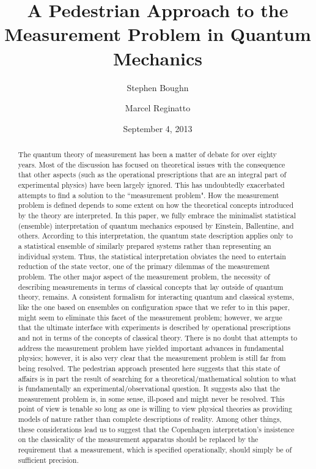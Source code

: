 \documentclass [12pt]{revtex4}
\begin{document}
\title{A Pedestrian Approach to the Measurement Problem in Quantum Mechanics}

\author{Stephen Boughn}


\author{Marcel Reginatto}
\address{Physikalisch-Technische Bundesanstalt, Braunschweig, Germany}

\date{September 4, 2013}

\begin{abstract}
\baselineskip=13pt
The quantum theory of measurement has been a matter of debate for
over eighty years. Most of the discussion has focused on theoretical
issues with the consequence that other aspects (such as the
operational prescriptions that are an integral part of experimental
physics) have been largely ignored. This has undoubtedly exacerbated
attempts to find a solution to the ``measurement problem". How the
measurement problem is defined depends to some extent on how the theoretical
concepts introduced by the theory are interpreted. In this paper, we
fully embrace the minimalist statistical (ensemble) interpretation
of quantum mechanics espoused by Einstein, Ballentine, and others.
According to this interpretation, the quantum state description
applies only to a statistical ensemble of similarly prepared systems
rather than representing an individual system. Thus, the statistical
interpretation obviates the need to entertain reduction of the state
vector, one of the primary dilemmas of the measurement problem. The
other major aspect of the measurement problem, the necessity of
describing measurements in terms of classical concepts that lay
outside of quantum theory, remains. A consistent formalism
for interacting quantum and classical systems, like the
one based on ensembles on configuration space that we
refer to in this paper, might seem to eliminate this facet of the
measurement problem; however, we argue that the ultimate interface
with experiments is described by operational prescriptions and not in terms of the concepts of classical theory. There is no doubt that attempts to address the measurement problem have
yielded important advances in fundamental physics;
however, it is also very clear that the measurement problem
is still far from being resolved.  The pedestrian approach presented here
suggests that this state of affairs is in part the result of searching for a
theoretical/mathematical solution to what is fundamentally an
experimental/observational question.  It suggests also that the measurement problem is, in some sense, ill-posed and
might never be resolved.  This point of view is tenable so long as one
is willing to view physical theories as providing models of nature
rather than complete descriptions of reality. Among other things,
these considerations lead us to suggest that the Copenhagen
interpretation's insistence on the classicality of the measurement
apparatus should be replaced by the requirement that a measurement,
which is specified operationally, should simply be of sufficient
precision.
\end{abstract}
\end{document}
